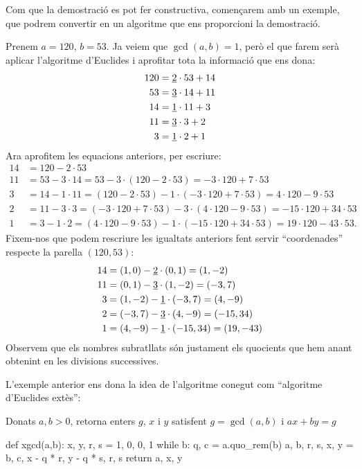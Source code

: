  Com que la demostració es pot fer constructiva, començarem amb un exemple, que podrem convertir en un algoritme que ens proporcioni la demostració.
 
 \begin{example}
 Prenem $a=120$, $b = 53$. Ja veiem que $\gcd(a,b)=1$, però el que farem serà aplicar l'algoritme d'Euclides i aprofitar tota la informació que ens dona:
 \begin{align*}
120 &= \underline 2\cdot 53 + 14\\
53 & = \underline 3\cdot 14 + 11\\
14 &= \underline 1 \cdot 11 + 3\\
11 &= \underline 3\cdot 3 + 2\\
3 &= \underline 1\cdot 2 + 1
 \end{align*}
 Ara aprofitem les equacions anteriors, per escriure:
 \begin{align*}
 14 &= 120 - 2\cdot 53\\
 11 &= 53 - 3\cdot 14 = 53 - 3\cdot(120 - 2\cdot 53) = -3\cdot 120 + 7\cdot 53\\
 3 &= 14 - 1\cdot 11 = (120 - 2\cdot 53) -1\cdot(-3\cdot 120 +7\cdot 53) = 4\cdot 120 -9\cdot 53\\
 2 &= 11 - 3\cdot 3 = (-3\cdot 120 + 7\cdot 53) - 3\cdot (4\cdot 120 - 9\cdot 53) = -15\cdot 120 + 34\cdot 53\\
 1 &= 3 - 1\cdot 2 = (4\cdot 120 - 9\cdot 53) - 1\cdot(-15\cdot 120 + 34\cdot 53) = 19\cdot 120 - 43\cdot 53.
 \end{align*}
 Fixem-nos que podem rescriure les igualtats anteriors fent servir ``coordenades'' respecte la parella $(120, 53)$:
 \begin{align*}
     14 &= (1,0) - \underline{2}\cdot (0,1) = (1,-2)\\
     11 &= (0,1) - \underline{3}\cdot (1,-2) = (-3,7)\\
     3 &=  (1,-2) - \underline{1}\cdot(-3,7) = (4,-9)\\
     2 &= (-3,7) - \underline{3}\cdot(4,-9) = (-15,34)\\
     1 &= (4,-9) - \underline{1}\cdot(-15,34) = (19,-43)
 \end{align*}
 Observem que els nombres subratllats són justament els quocients que hem anant obtenint en les divisions successives.
 \end{example}
 L'exemple anterior ens dona la idea de l'algoritme conegut com ``algoritme d'Euclides extès'':
 \begin{algo}
 \caption{Donats $a,b>0$, retorna enters $g$, $x$ i $y$ satisfent $g=\gcd(a,b)$ i $ax+by=g$}
 \begin{python}
 def xgcd(a,b):
    x, y, r, s = 1, 0, 0, 1
    while b:
        q, c = a.quo_rem(b)
        a, b, r, s, x, y = b, c, x - q * r, y - q * s, r, s
    return a, x, y
 \end{python}
 \end{algo}
 
